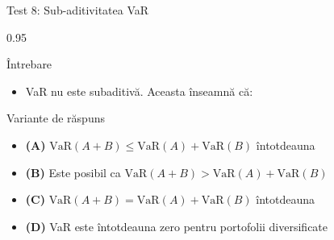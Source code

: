 \documentclass[9pt, aspectratio=169, t]{beamer}
\begin{document}
\begin{frame}{Test 8: Sub-aditivitatea VaR}
    \begin{cminipage}{0.95\textwidth}
    \begin{alertblock}{Întrebare}
        \begin{itemize}\setlength{\itemsep}{0pt}
            \item VaR nu este subaditivă. Aceasta înseamnă că:
        \end{itemize}
    \end{alertblock}

    \begin{block}{Variante de răspuns}
    \begin{itemize}\setlength{\itemsep}{0pt}
        \item \textcolor{MainBlue}{\textbf{(A)}} $\text{VaR}(A+B) \leq \text{VaR}(A) + \text{VaR}(B)$ întotdeauna
        \item \textcolor{MainBlue}{\textbf{(B)}} Este posibil ca $\text{VaR}(A+B) > \text{VaR}(A) + \text{VaR}(B)$
        \item \textcolor{MainBlue}{\textbf{(C)}} $\text{VaR}(A+B) = \text{VaR}(A) + \text{VaR}(B)$ întotdeauna
        \item \textcolor{MainBlue}{\textbf{(D)}} VaR este întotdeauna zero pentru portofolii diversificate
    \end{itemize}
    \end{block}
    \end{cminipage}
\end{frame}
\end{document}

